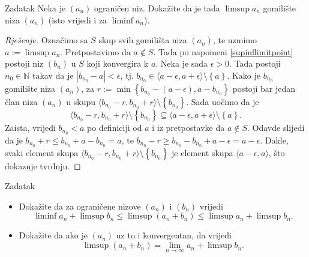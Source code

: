 \begin{exercise}{Zadatak}
\label{limsupisalimitpoint}
Neka je $(a_n)$ ograničen niz. Dokažite da je tada $\limsup{a_n}$ gomilište niza $(a_n)$ (isto vrijedi i za $\liminf{a_n}$).
\end{exercise}
\begin{proof}[Rješenje]
Označimo sa $S$ skup svih gomilišta niza $(a_n)$, te uzmimo $a:=\limsup{a_n}$. Pretpostavimo da $a\notin S$. Tada po napomeni \ref{supinflimitpoint} postoji niz $(b_n)$ u $S$ koji konvergira k $a$. Neka je sada $\epsilon>0$. Tada postoji $n_0\in \mathbb{N}$ takav da je $|b_{n_0}-a|<\epsilon$, tj. $b_{n_0}\in \langle a-\epsilon, a+\epsilon\rangle\setminus{\left\{a\right\}}$. Kako je $b_{n_0}$ gomilište niza $(a_n)$, za $r:=\min\left\{ b_{n_0}-(a-\epsilon), a-b_{n_0}\right\}$ postoji bar jedan član niza $(a_n)$ u skupu $\langle b_{n_0}-r, b_{n_0}+r\rangle\setminus{\left\{b_{n_0}\right\}}$. Sada uočimo da je
$$\langle b_{n_0}-r, b_{n_0}+r\rangle\setminus{\left\{b_{n_0}\right\}}\subseteq \langle a-\epsilon, a+\epsilon\rangle\setminus{\left\{a\right\}}.$$
Zaista, vrijedi $b_{n_0}<a$ po definiciji od $a$ i iz pretpostavke da $a\notin S$. Odavde slijedi da je $b_{n_0}+r\leq b_{n_0}+a-b_{n_0}=a$, te $b_{n_0}-r\geq b_{n_0}-b_{n_0}+a-\epsilon=a-\epsilon$. Dakle, svaki element skupa $\langle b_{n_0}-r, b_{n_0}+r\rangle\setminus{\left\{b_{n_0}\right\}}$ je element skupa $\langle a-\epsilon, a\rangle$, što dokazuje tvrdnju.
\end{proof}
\begin{exercise}{Zadatak} \textbf{}
\label{limsupofsum}
\begin{itemize}
\item[a)] Dokažite da za ograničene nizove $(a_n)$ i $(b_n)$ vrijedi
$$\liminf{a_n}+\limsup{b_n}\leq \limsup{(a_n+b_n)}\leq \limsup{a_n}+\limsup{b_n}.$$
\item[b)] Dokažite da ako je $(a_n)$ uz to i konvergentan, da vrijedi
$$\limsup{(a_n+b_n)}=\lim\limits_{n\to\infty}{a_n}+\limsup{b_n}.$$
\end{itemize}
\end{exercise}

